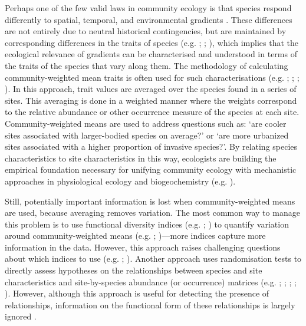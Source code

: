 \documentclass[12pt]{ecology}
\begin{document}
Perhaps one of the few valid laws in community ecology is that species respond differently to spatial, temporal, and environmental gradients \citep{Gleason1917,Whittaker1967}.  These differences are not entirely due to neutral historical contingencies, but are maintained by corresponding differences in the traits of species (e.g. ; ; ), which implies that the ecological relevance of gradients can be characterised and understood in terms of the traits of the species that vary along them.  The methodology of calculating community-weighted mean traits is often used for such characterisations (e.g. ; ; ; ).  In this approach, trait values are averaged over the species found in a series of sites.  This averaging is done in a weighted manner where the weights correspond to the relative abundance or other occurrence measure of the species at each site.  Community-weighted means are used to address questions such as:  `are cooler sites associated with larger-bodied species on average?' or `are more urbanized sites associated with a higher proportion of invasive species?'.  By relating species characteristics to site characteristics in this way, ecologists are building the empirical foundation necessary for unifying community ecology with mechanistic approaches in physiological ecology and biogeochemistry (e.g. ).

Still, potentially important information is lost when community-weighted means are used, because averaging removes variation.  The most common way to manage this problem is to use functional diversity indices (e.g. ; ) to quantify variation around community-weighted means (e.g. ; )---more indices capture more information in the data.  However, this approach raises challenging questions about which indices to use (e.g. ; ).  Another approach uses randomisation tests to directly assess hypotheses on the relationships between species and site characteristics and site-by-species abundance (or occurrence) matrices (e.g. ; ; ; ; ).  However, although this approach is useful for detecting the presence of relationships, information on the functional form of these relationships is largely ignored \citep{IvesAndHelmus2011}.
\end{document}
